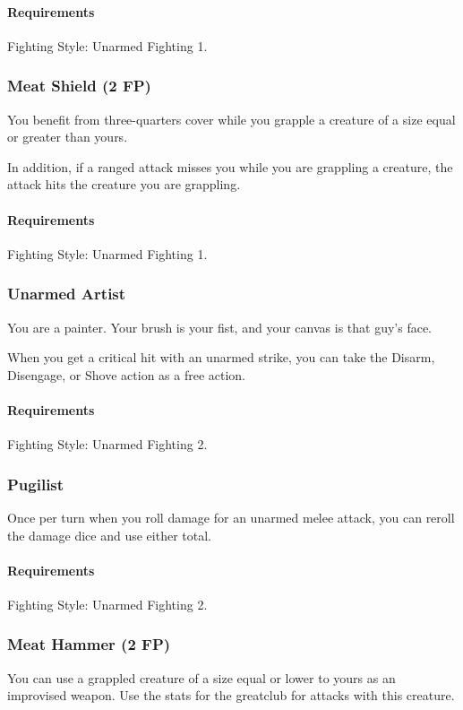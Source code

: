     \paragraph{Requirements} Fighting Style: Unarmed Fighting 1.
\subsubsection{Meat Shield (2 FP)} \label{feat::meatshield}
    You benefit from three-quarters cover while you grapple a creature of a size equal or greater than yours.

    In addition, if a ranged attack misses you while you are grappling a creature, the attack hits the creature you are grappling.
    \paragraph{Requirements} Fighting Style: Unarmed Fighting 1.
\subsubsection{Unarmed Artist} \label{feat::unarmedartist}
    You are a painter.
    Your brush is your fist, and your canvas is that guy's face.

    When you get a critical hit with an unarmed strike, you can take the Disarm, Disengage, or Shove action as a free action.
    \paragraph{Requirements} Fighting Style: Unarmed Fighting 2.
\subsubsection{Pugilist} \label{feat::pugilist}
    Once per turn when you roll damage for an unarmed melee attack, you can reroll the damage dice and use either total.
    \paragraph{Requirements} Fighting Style: Unarmed Fighting 2.
\subsubsection{Meat Hammer (2 FP)} \label{feat::meathammer}
    You can use a grappled creature of a size equal or lower to yours as an improvised weapon.
    Use the stats for the greatclub for attacks with this creature.

